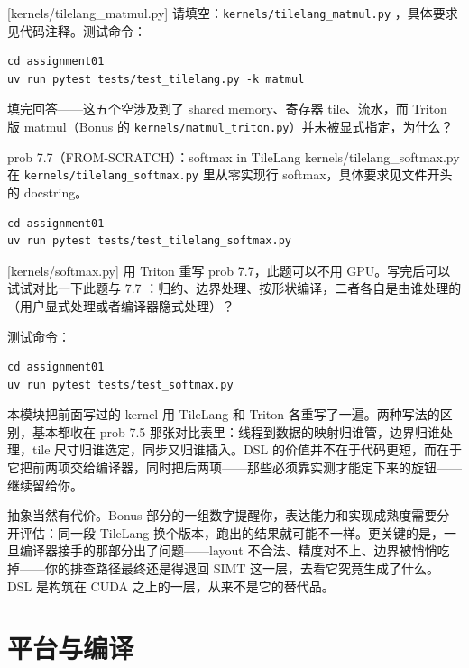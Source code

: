\documentclass[11pt,a4paper,fontset=none]{ctexart}
\begin{document}
[kernels/tilelang\_matmul.py]
请填空：\texttt{kernels/tilelang\_matmul.py} ，具体要求见代码注释。测试命令：

\begin{lstlisting}
cd assignment01
uv run pytest tests/test_tilelang.py -k matmul
\end{lstlisting}

填完回答——这五个空涉及到了 shared memory、寄存器 tile、流水，而 Triton 版 matmul（Bonus 的 \texttt{kernels/matmul\_triton.py}）并未被显式指定，为什么？

\begin{capstone}{prob 7.7（FROM-SCRATCH）：softmax in TileLang \hfill {\footnotesize\ttfamily kernels/tilelang\_softmax.py}}
在 \texttt{kernels/tilelang\_softmax.py} 里从零实现行 softmax，具体要求见文件开头的 docstring。
\end{capstone}

\begin{lstlisting}
cd assignment01
uv run pytest tests/test_tilelang_softmax.py
\end{lstlisting}

[kernels/softmax.py]
用 Triton 重写 prob 7.7，此题可以不用 GPU。写完后可以试试对比一下此题与 7.7 ：归约、边界处理、按形状编译，二者各自是由谁处理的（用户显式处理或者编译器隐式处理）？

测试命令：

\begin{lstlisting}
cd assignment01
uv run pytest tests/test_softmax.py
\end{lstlisting}

\begin{lookback}
本模块把前面写过的 kernel 用 TileLang 和 Triton 各重写了一遍。两种写法的区别，基本都收在 prob 7.5 那张对比表里：线程到数据的映射归谁管，边界归谁处理，tile 尺寸归谁选定，同步又归谁插入。DSL 的价值并不在于代码更短，而在于它把前两项交给编译器，同时把后两项——那些必须靠实测才能定下来的旋钮——继续留给你。

抽象当然有代价。Bonus 部分的一组数字提醒你，表达能力和实现成熟度需要分开评估：同一段 TileLang 换个版本，跑出的结果就可能不一样。更关键的是，一旦编译器接手的那部分出了问题——layout 不合法、精度对不上、边界被悄悄吃掉——你的排查路径最终还是得退回 SIMT 这一层，去看它究竟生成了什么。DSL 是构筑在 CUDA 之上的一层，从来不是它的替代品。
\end{lookback}

\section{平台与编译}
\end{document}
